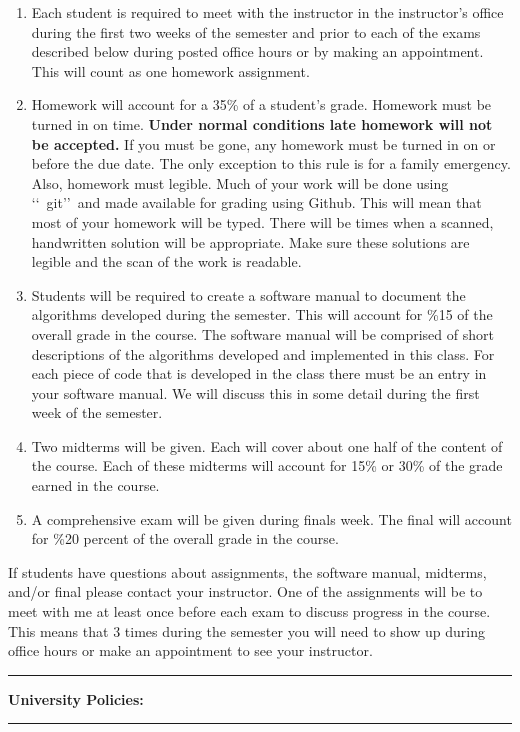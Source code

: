 \documentclass[10pt,fleqn]{article}
\begin{document}
\begin{enumerate}
\item Each student is required to meet with the instructor in the instructor's
      office during the first two weeks of the semester and prior to each of the
      exams described below during posted office hours or by making an
      appointment. This will count as one homework assignment.
\item Homework will account for a 35\% of a student's grade. Homework must be
      turned in on time. {\bf Under normal conditions late homework will not be
      accepted.} If you must be gone, any homework must be turned in on or
      before the due date. The only exception to this rule is for a family
      emergency. Also, homework must legible. Much of your work will be done
      using \lq\lq\ git\rq\rq\ and made available for grading using Github. This
      will mean that most of your homework will be typed. There will be times
      when a scanned, handwritten solution will be appropriate. Make sure these
      solutions are legible and the scan of the work is readable.
\item Students will be required to create a software manual to document the
      algorithms developed during the semester. This will account for \%15 of
      the overall grade in the course. The software manual will be comprised of
      short descriptions of the algorithms developed and implemented in this
      class. For each piece of code that is developed in the class there must be
      an entry in your software manual. We will discuss this in some detail
      during the first week of the semester.
\item Two midterms will be given. Each will cover about one half of the content
      of the course. Each of these midterms will account for 15\% or 30\% of the
      grade earned in the course.
\item A comprehensive exam will be given during finals week. The final will
      account for \%20 percent of the overall grade in the course.
\end{enumerate}
If students have questions about assignments, the software manual, midterms, 
and/or final please contact your instructor. One of the assignments will be to
meet with me at least once before each exam to discuss progress in the course.
This means that 3 times during the semester you will need to show up during
office hours or make an appointment to see your instructor.
\vskip0.1in\hrule\vskip0.1in
\noindent
{\bf University Policies:}
\vskip0.1in\hrule\vskip0.1in
\end{document}
